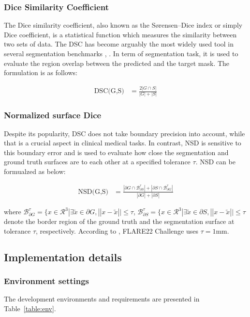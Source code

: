 \subsubsection{Dice Similarity Coefficient}

The Dice similarity coefficient, also known as the Sørensen–Dice index or simply Dice coefficient, is a statistical function which measures the similarity between two sets of data. The DSC has become arguably the most widely used tool in several segmentation benchmarks \cite{heller2021state}, \cite{bilic2019liver}.  In term of segmentation task, it is used to evaluate the region overlap between the predicted and the target mask. The formulation is as follows:

\begin{align}
        \text{DSC(G,S)} &= \frac{2|G \cap S|}{|G| + |S|}
\end{align}

\subsubsection{Normalized surface Dice}

Despite its popularity, DSC does not take boundary precision into account, while that is a crucial aspect in clinical medical tasks. In contrast, NSD is sensitive to this boundary error and is used to evaluate how close the segmentation and ground truth surfaces are to each other at a specified tolerance $\tau$. NSD can be formualzed as below:

\begin{align}
        \text{NSD(G,S)} &= \frac{|\partial G \cap \mathcal{B}^{\tau}_{\partial S}| +  |\partial S \cap \mathcal{B}^{\tau}_{\partial G}|}{|\partial G| + |\partial S|}
\end{align}

where $\mathcal{B}^{\tau}_{\partial G} = \{ x \in \mathcal{R}^3 | \exists \tilde{x} \in \partial G, ||x - \tilde{x} || \leq \tau$, $\mathcal{B}^{\tau}_{\partial S} = \{ x \in \mathcal{R}^3 | \exists \tilde{x} \in \partial S, ||x - \tilde{x} || \leq \tau$ denote the border region of the ground truth and the segmentation surface at tolerance $\tau$, respectively. According to \cite{AbdomenCT-1K}, FLARE22 Challenge uses $\tau = 1\text{mm}$.

\subsection{Implementation details}
\subsubsection{Environment settings}
The development environments and requirements are presented in Table~\ref{table:env}.


